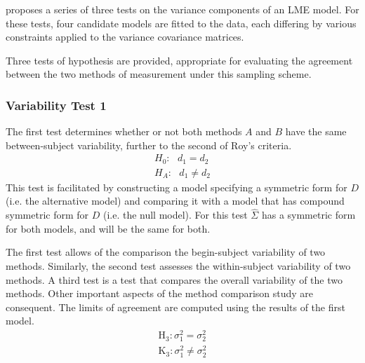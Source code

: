 \documentclass[12pt, a4paper]{report}
\theoremstyle{plain}
\theoremstyle{definition}
\theoremstyle{remark}
\begin{document}
	

\citet{ARoy2009} proposes a series of three tests on the variance components of an LME model. For these tests, four candidate models are fitted to the data, each differing by various constraints applied to the variance covariance matrices. 


	
	
	 Three tests of hypothesis are provided, appropriate for evaluating the agreement between the two methods of measurement under this sampling scheme. 
	
	\subsubsection{Variability Test 1}
	The first test determines whether or not both methods $A$ and $B$ have the same between-subject variability, further to the second of Roy's criteria.
	\begin{eqnarray*}
		H_{0}: \mbox{ }d_{1}  = d_{2} \\
		H_{A}: \mbox{ }d_{1}  \neq d_{2}
	\end{eqnarray*}
	This test is facilitated by constructing a model specifying a symmetric form for $D$ (i.e. the alternative model) and comparing it with a model that has compound symmetric form for $D$ (i.e. the null model). For this test ${\hat{\Sigma}}$ has a symmetric form for both models, and will be the same for both.



The first test allows of the comparison the begin-subject variability of two methods. Similarly, the second test assesses the within-subject variability of two methods. A third test is a test that compares the overall variability of the two methods. Other important aspects of the method comparison study are consequent. The limits of agreement are computed using the results of the first model.
\begin{eqnarray*}
	\operatorname{H_3} : \sigma^2_1 = \sigma^2_2 \\
	\operatorname{K_3} : \sigma^2_1 \neq \sigma^2_2
\end{eqnarray*}
\end{document}
